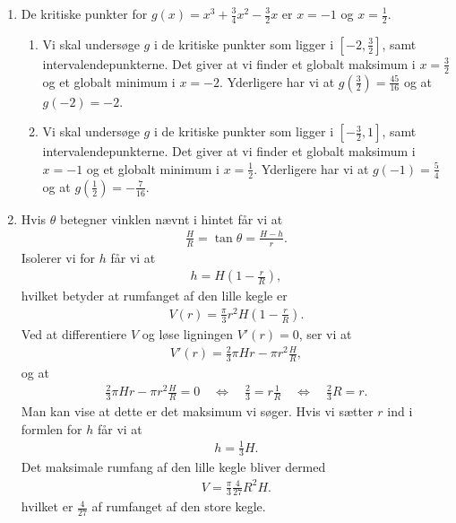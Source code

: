 \begin{enumerate}
%	


	\item De kritiske punkter for $ g(x)=x^3+\frac{3}{4}x^2-\frac{3}{2}x $ er $x=-1$ og $x=\frac{1}{2}$.
	\begin{enumerate}
		\item Vi skal undersøge $g$ i de kritiske punkter som ligger i $ [-2,\frac{3}{2}] $, samt intervalendepunkterne. Det giver at vi finder et globalt maksimum i $x=\frac{3}{2}$ og et globalt minimum i $x=-2$. Yderligere har vi at $g(\frac{3}{2})=\frac{45}{16}$ og at $g(-2)=-2$.
		\item Vi skal undersøge $g$ i de kritiske punkter som ligger i  $ [-\frac{3}{2},1] $, samt intervalendepunkterne. Det giver at vi finder et globalt maksimum i $x=-1$ og et globalt minimum i $x=\frac{1}{2}$. Yderligere har vi at $g(-1)=\frac{5}{4}$ og at $g(\frac{1}{2})=-\frac{7}{16}$.
	\end{enumerate}
 
 	\item \label{it:opt3ans} Hvis $\theta$ betegner vinklen nævnt i hintet får vi at
 	\begin{align*}
 	\frac{H}{R}=\tan \theta= \frac{H-h}{r}.
 	\end{align*}
 	Isolerer vi for $h$ får vi at
 	\begin{align*}
 	h=H(1-\frac{r}{R}),
 	\end{align*}
 	hvilket betyder at rumfanget af den lille kegle er
 	\begin{align*}
 	V(r)=\frac{\pi}{3} r^2 H(1-\frac{r}{R}).
 	\end{align*}
 	Ved at differentiere $V$ og løse ligningen $V'(r)=0$, ser vi at
 	\begin{align*}
 	V'(r)=\frac{2}{3}\pi Hr-\pi r^2 \frac{H}{R},
 	\end{align*}
 	og at
 	\begin{align*}
	\frac{2}{3}\pi Hr-\pi r^2 \frac{H}{R}=0\quad \Leftrightarrow\quad \frac{2}{3}=r \frac{1}{R}\quad \Leftrightarrow\quad \frac{2}{3}R=r.
 	\end{align*}
 	Man kan vise at dette er det maksimum vi søger. Hvis vi sætter $r$ ind i formlen for $h$ får vi at
 	\begin{align*}
 	h=\frac{1}{3}H.
 	\end{align*}
 	Det maksimale rumfang af den lille kegle bliver dermed
 	\begin{align*}
 	V=\frac{\pi}{3}\frac{4}{27}R^2H.
 	\end{align*}
 	hvilket er $\frac{4}{27}$ af rumfanget af den store kegle.
 	

\end{enumerate}
